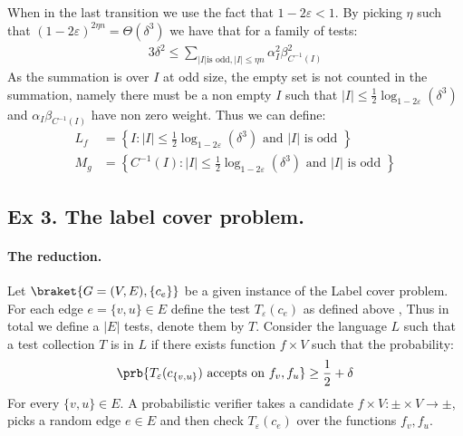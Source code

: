\documentclass{article}
\begin{document}
 When in the last transition we use the fact that $1-2\varepsilon < 1$. By picking $\eta$ such that $(1-2\varepsilon)^{2\eta n } = \Theta\left( \delta^{3} \right)$ we have that for a family of tests:   
 \begin{equation}
   \label{equ:we}
   \begin{split}
     3\delta^{2} \le  \sum_{|I| \text{is odd} , |I| \le \eta n  }{\alpha_{I}^{2}\beta_{C^{-1}(I)}^{2}}
   \end{split}
 \end{equation}
 As the summation is over $I$ at odd size, the empty set is not counted in the summation, namely there must be a non empty $I$ such that $|I| \le \frac{1}{2} \log_{1-2\varepsilon}\left( \delta^{3} \right)$ and $\alpha_{I}\beta_{C^{-1}\left( I \right)}$ have non zero weight. Thus we can define: 
 \begin{equation*}
   \begin{split}
 L_{f} & = \left\{ I : |I| \le \frac{1}{2} \log_{1-2\varepsilon}\left( \delta^{3} \right) \text{ and } |I| \text{ is odd } \right\} \\
 M_{g} & = \left\{ C^{-1}(I) : |I| \le \frac{1}{2} \log_{1-2\varepsilon}\left( \delta^{3} \right) \text{ and } |I| \text{ is odd } \right\}
   \end{split}
 \end{equation*}
%
\subsection{Ex 3. The label cover problem.} 
\paragraph{The reduction.} Let $\braket{G=(V,E), \{ c_{e} \} }$ be a given instance of the Label cover problem. For each edge $e = \{v,u\} \in E$ define the test $T_{\varepsilon}\left( c_{e} \right)$ as defined above , Thus in total we define a $|E|$ tests, denote them by $T$. Consider the language $L$ such that a test collection $T$ is in $L$ if there exists function $f \times V$ such that the probability:  
\begin{equation*}
  \begin{split}
    \prb{T_{\varepsilon}(c_{ \{ v,u\} }) \text{ accepts on } f_{v},f_{u} } \ge \frac{1}{2} + \delta
  \end{split}
\end{equation*}
For every $\{v, u\} \in E$. A probabilistic verifier takes a candidate $f\times V : \pm  \times V \rightarrow \pm$, picks a random edge $e \in E$ and then check $T_{\varepsilon}\left( c_{e} \right)$ over the functions $f_{v},f_{u}$.    
\end{document}
